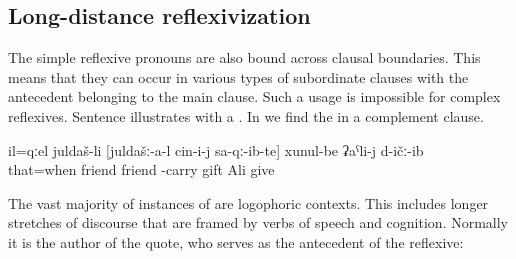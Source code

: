 \subsection{Long-distance reflexivization}
\label{ssec:Long-distance reflexivization}

The simple reflexive pronouns are also bound across clausal boundaries. This means that they can occur in various types of subordinate clauses with the antecedent belonging to the main clause. Such a usage is impossible for complex reflexives. Sentence  illustrates  with a . In  we find the  in a complement clause.

\begin{exe}
	\ex	\label{ex:At that the friend gave to Ali the gifts@5}
	\gll	il=qːel	juldaš-li	[juldašː-a-l	cin-i-j	sa-qː-ib-te]		xunul-be	ʡaˁli-j	d-ičː-ib\\
		that=when	friend	friend		-carry 		gift	Ali	give\\
	\glt	{}	
\end{exe}

The vast majority of instances of  are logophoric contexts. This includes longer stretches of discourse that are framed by verbs of speech and cognition. Normally it is the author of the quote, who serves as the antecedent of the reflexive:

